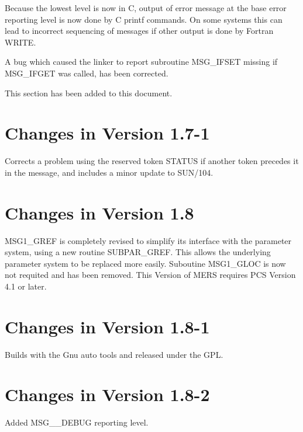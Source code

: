 \documentclass[twoside,11pt]{starlink}
\begin{document}
Because the lowest level is now in C, output of error message at the base
error reporting level is now done by C printf commands. On some systems this
can lead to incorrect sequencing of messages if other output is done by
Fortran WRITE.

A bug which caused the linker to report subroutine MSG\_IFSET missing if
MSG\_IFGET was called, has been corrected.

This section has been added to this document.

\section{Changes in Version 1.7-1}

Corrects a problem using the reserved token STATUS if another token precedes
it in the message, and includes a minor update to SUN/104.

\section{Changes in Version 1.8}

MSG1\_GREF is completely revised to simplify its interface with the parameter
system, using a new routine SUBPAR\_GREF. This allows the underlying parameter
system to be replaced more easily. Suboutine MSG1\_GLOC is now not requited and
has been removed. This Version of MERS requires PCS Version 4.1 or later.

\section{Changes in Version 1.8-1}

Builds with the Gnu auto tools and released under the GPL.

\section{Changes in Version 1.8-2}

Added MSG\_\_DEBUG reporting level.


\end{document}
